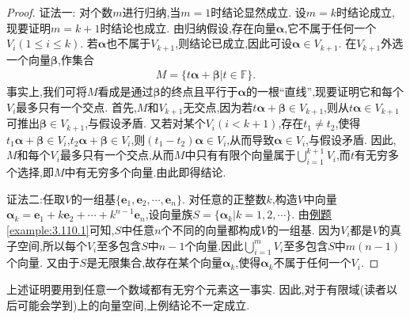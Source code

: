 \documentclass[../../main.tex]{subfiles}%
\begin{document}
\begin{proof}

{\color{blue}证法一:}
对个数\(m\)进行归纳,当\(m = 1\)时结论显然成立. 设\(m = k\)时结论成立,现要证明\(m = k + 1\)时结论也成立. 由归纳假设,存在向量\(\boldsymbol{\alpha}\),它不属于任何一个\(V_i(1\leqslant  i\leqslant  k)\). 若\(\boldsymbol{\alpha}\)也不属于\(V_{k + 1}\),则结论已成立,因此可设\(\boldsymbol{\alpha}\in V_{k + 1}\). 在\(V_{k + 1}\)外选一个向量\(\boldsymbol{\beta}\),作集合
\begin{align*}
M = \{t\boldsymbol{\alpha}+\boldsymbol{\beta}|t\in\mathbb{F}\}.
\end{align*}
事实上,我们可将\(M\)看成是通过\(\boldsymbol{\beta}\)的终点且平行于\(\boldsymbol{\alpha}\)的一根“直线”,现要证明它和每个\(V_i\)最多只有一个交点. 首先,\(M\)和\(V_{k + 1}\)无交点,因为若\(t\boldsymbol{\alpha}+\boldsymbol{\beta}\in V_{k + 1}\),则从\(t\boldsymbol{\alpha}\in V_{k + 1}\)可推出\(\boldsymbol{\beta}\in V_{k + 1}\),与假设矛盾. 又若对某个\(V_i(i<k + 1)\),存在\(t_1\neq t_2\),使得\(t_1\boldsymbol{\alpha}+\boldsymbol{\beta}\in V_i\),\(t_2\boldsymbol{\alpha}+\boldsymbol{\beta}\in V_i\),则\((t_1 - t_2)\boldsymbol{\alpha}\in V_i\),从而导致\(\boldsymbol{\alpha}\in V_i\),与假设矛盾. 因此,\(M\)和每个\(V_i\)最多只有一个交点,从而\(M\)中只有有限个向量属于\(\bigcup_{i=1}^{k+1}{V_i}\),而\(t\)有无穷多个选择,即$M$中有无穷多个向量.由此即得结论. 

{\color{blue}证法二:}任取\(V\)的一组基\(\{\boldsymbol{e}_1,\boldsymbol{e}_2,\cdots,\boldsymbol{e}_n\}\). 对任意的正整数\(k\),构造\(V\)中向量\(\boldsymbol{\alpha}_k=\boldsymbol{e}_1 + k\boldsymbol{e}_2+\cdots + k^{n - 1}\boldsymbol{e}_n\),设向量族\(S = \{\boldsymbol{\alpha}_k|k = 1,2,\cdots\}\). 由\hyperref[example:3.110.1]{例题\ref{example:3.110.1}}可知,\(S\)中任意\(n\)个不同的向量都构成\(V\)的一组基. 因为\(V_i\)都是\(V\)的真子空间,所以每个\(V_i\)至多包含\(S\)中\(n - 1\)个向量.因此$\bigcup_{i=1}^m{V_i}$至多包含$S$中$m(n-1)$个向量.
又由于\(S\)是无限集合,故存在某个向量\(\boldsymbol{\alpha}_k\),使得\(\boldsymbol{\alpha}_k\)不属于任何一个\(V_i\).

\end{proof}
\begin{remark}
上述证明要用到任意一个数域都有无穷个元素这一事实. 因此,对于有限域(读者以后可能会学到)上的向量空间,上例结论不一定成立.
\end{remark}
\end{document}
